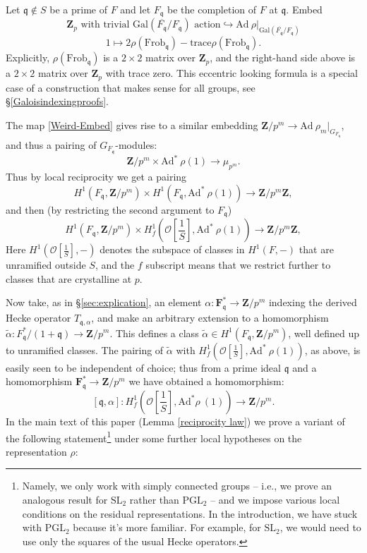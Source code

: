 \documentclass[10pt]{amsart}
\newcommand{\Z}{\mathbf{Z}}
\newcommand{\Gal}{\mathrm{Gal}}
\newcommand{\Ad}{\mathrm{Ad}}
\newcommand{\SL}{\mathrm{SL}}
\newcommand{\PGL}{\mathrm{PGL}}
\newcommand{\ramprimes}{S}
\theoremstyle{remark}
\newcommand{\F}{\mathbf{F}}
\begin{document}
 Let $\mathfrak{q} \notin \ramprimes$ be a prime of $F$ and let 
 $F_{\mathfrak{q}}$ be the completion of $F$ at $\mathfrak{q}$.  Embed
\begin{equation} \label{Weird-Embed} \Z_{p} \mbox{ with trivial $\Gal(\overline{F_{\mathfrak{q}}}/F_{\mathfrak{q}})$ action}  \hookrightarrow \Ad  \ \rho|_{\Gal(\overline{F_{\mathfrak{q}}}/F_{\mathfrak{q}})}\end{equation}
$$ 1 \mapsto  2 \rho(\mathrm{Frob}_{\mathfrak{q}})-   \mathrm{trace} \rho(\mathrm{Frob}_{\mathfrak{q}}). $$
Explicitly, $\rho(\mathrm{Frob}_{\mathfrak{q}})$ is a $2 \times 2$ matrix over $\Z_{p}$, and the right-hand side above
is a $2\times 2$ matrix over $\Z_{p}$ with trace zero. This eccentric looking formula is a special case of a construction that makes sense for all groups, 
see \S \ref{Galoisindexingproofs}. 


The map \eqref{Weird-Embed} gives rise to a similar embedding $\Z/p^m \rightarrow \Ad \ \rho_m|_{G_{F_{\mathfrak{q}}}}$, and thus a pairing of $G_{F_{\mathfrak{q}}}$-modules: 
$$\Z/p^m \times \Ad^* \ \rho(1) \rightarrow \mu_{p^m}. $$
 Thus  by local reciprocity we get a pairing
$$ H^1(F_{\mathfrak{q}},\Z/p^m) \times H^1(F_{\mathfrak{q}}, \Ad^* \ \rho(1)) \rightarrow \Z/p^m \Z,$$
and then (by restricting the second argument to $F_{\mathfrak{q}}$) 
$$ H^1(F_{\mathfrak{q}},\Z/p^m) \times H^1_f(\mathcal{O}[\frac{1}{S}],  \Ad^* \ \rho(1)) \rightarrow \Z/p^m \Z,$$
Here $H^1(\mathcal{O}[\frac{1}{S}], -) $ denotes the subspace of classes in $H^1(F, -)$ that
are unramified outside $S$, and the $f$ subscript means that we restrict further
to classes that are crystalline at $p$. 
 
Now take, as in
\S \ref{sec:explication}, an
 element $\alpha:   \F_{\mathfrak{q}}^* \rightarrow \Z/p^m$
indexing the derived Hecke operator $T_{\mathfrak{q},\alpha}$, 
and make an arbitrary extension  to a homomorphism $\tilde{\alpha}: F_{\mathfrak{q}}^*/(1+\mathfrak{q}) \rightarrow \Z/p^m$. 
This defines a class $\tilde{\alpha} \in H^1(F_{\mathfrak{q}},\Z/p^m)$, well defined up to unramified classes.
The pairing of $\tilde{\alpha}$ with $H^1_f(\mathcal{O}[\frac{1}{S}], \Ad^* \ \rho(1))$, as above, is easily seen to be independent of choice; thus from
a prime ideal $\mathfrak{q}$ and  a homomorphism $ \F_{\mathfrak{q}}^* \rightarrow \Z/p^m$ 
 we have  obtained a homomorphism: 
\begin{equation} \label{padef} [\mathfrak{q}, \alpha ] : H^1_f(\mathcal{O}[\frac{1}{\ramprimes}],  \Ad^* \rho \ (1)) \longrightarrow  \Z/p^m.\end{equation}
%
%
%
%
%
%
%
%
%
 In the main text of this paper (Lemma \ref{reciprocity law})
  we prove  a variant  of the following statement\footnote{Namely, we only work with simply connected groups  -- i.e., we prove
 an analogous result for $\SL_2$ rather than $\PGL_2$ -- and we impose various local conditions on the residual representations. In the introduction, we have stuck with $\PGL_2$ because it's more familiar. For example,
for $\SL_2$, we would need to use only the squares of the usual Hecke operators.  }
 under some further  local hypotheses on the representation $\rho$: 
\end{document}
